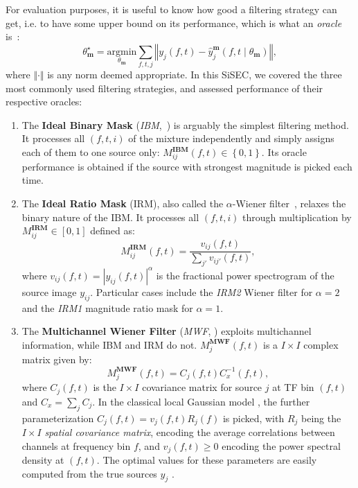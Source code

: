 \documentclass{llncs}
\newcommand{\sboxed}[1]{\textbf{#1}}
\newcommand{\thet}[1]{\theta_{\sboxed{#1}}}
\newcommand{\ft}{\left(f,t\right)}
\newcommand{\ftt}[1]{\left(f,t\mid\thet{#1}\right)}
\begin{document}
For evaluation purposes, it is useful to know how good a filtering strategy can get, i.e. to have some upper bound on its performance, which is what an \textit{oracle} is~\cite{vincent2007oracle}:
\begin{equation}
  \thet{m}^{\star}=\underset{\thet{m}}{\text{argmin}}\sum_{f,t,j}\left\Vert y_{j}\ft-\hat{y}_{j}^{\sboxed{m}}\ftt{m}\right\Vert,
  \end{equation}
where $\Vert\cdot\Vert$ is any norm deemed appropriate. In this SiSEC, we covered the three most commonly used filtering strategies, and assessed performance of their respective oracles:
\begin{enumerate}
  \item The \textbf{Ideal Binary Mask} (\textit{IBM},~\cite{wang2005}) is arguably the simplest filtering method. It processes all $\left(f,t,i\right)$ of the mixture independently and simply assigns each of them to one source only:   $M_{ij}^\sboxed{IBM}\ft\in\left\{0,1\right\}$. Its oracle performance is obtained if the source with strongest magnitude is picked each time.
  \item The \textbf{Ideal Ratio Mask} (IRM), also called the $\alpha$-Wiener filter~\cite{liutkus15}, relaxes the binary nature of the IBM. It processes all $\left(f,t,i\right)$ through multiplication by $M_{ij}^\sboxed{IRM}\in\left[0,1\right]$ defined as:
  \begin{equation}
    M^{\sboxed{IRM}}_{ij}\ft=\frac{v_{ij}\ft}{\sum_{j'}v_{ij'}\ft},
  \end{equation}
where $v_{ij}\ft=\left|y_{ij}\ft\right|^\alpha$ is the fractional power spectrogram of the source image $y_{ij}$. Particular cases include the \textit{IRM2} Wiener filter for $\alpha=2$ and the \textit{IRM1} magnitude ratio mask for $\alpha=1$.
  \item The \textbf{Multichannel Wiener Filter} (\textit{MWF}, \cite{duong10}) exploits multichannel information, while IBM and IRM do not. $M^{\sboxed{MWF}}_{j}\ft$ is a $I\times I$ complex matrix given by:
  \begin{equation}
    M_{j}^{\sboxed{MWF}}\ft=C_{j}\ft C_{x}^{-1}\ft,
  \end{equation}
where $C_j\ft$ is the $I\times I$ covariance matrix for source $j$ at TF bin $\ft$ and $C_x=\sum_j C_j$. In the classical local Gaussian model \cite{duong10}, the further parameterization $C_j\ft=v_j\ft R_j\left(f\right)$ is picked, with $R_j$ being the $I\times I$ \textit{spatial covariance matrix}, encoding the average correlations between channels at frequency bin $f$, and $v_j\ft\geq0$ encoding the power spectral density at $\ft$. The optimal values for these parameters are easily computed from the true sources $y_j$ \cite{liutkus2013}.
\end{enumerate}
\end{document}
